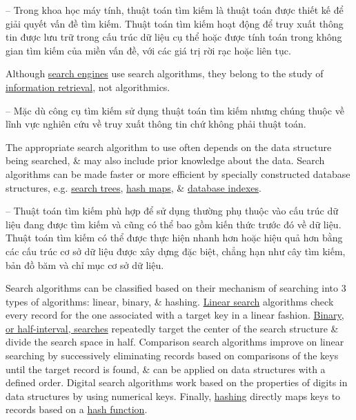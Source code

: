 \documentclass{article}
\begin{document}
-- Trong khoa học máy tính, thuật toán tìm kiếm là thuật toán được thiết kế để giải quyết vấn đề tìm kiếm. Thuật toán tìm kiếm hoạt động để truy xuất thông tin được lưu trữ trong cấu trúc dữ liệu cụ thể hoặc được tính toán trong không gian tìm kiếm của miền vấn đề, với các giá trị rời rạc hoặc liên tục.

Although \href{https://en.wikipedia.org/wiki/Search_engine_(computing)}{search engines} use search algorithms, they belong to the study of \href{https://en.wikipedia.org/wiki/Information_retrieval}{information retrieval}, not algorithmics.

-- Mặc dù công cụ tìm kiếm sử dụng thuật toán tìm kiếm nhưng chúng thuộc về lĩnh vực nghiên cứu về truy xuất thông tin chứ không phải thuật toán.

The appropriate search algorithm to use often depends on the data structure being searched, \& may also include prior knowledge about the data. Search algorithms can be made faster or more efficient by specially constructed database structures, e.g. \href{https://en.wikipedia.org/wiki/Search_tree}{search trees}, \href{https://en.wikipedia.org/wiki/Hash_map}{hash maps}, \& \href{https://en.wikipedia.org/wiki/Database_index}{database indexes}.

-- Thuật toán tìm kiếm phù hợp để sử dụng thường phụ thuộc vào cấu trúc dữ liệu đang được tìm kiếm và cũng có thể bao gồm kiến thức trước đó về dữ liệu. Thuật toán tìm kiếm có thể được thực hiện nhanh hơn hoặc hiệu quả hơn bằng các cấu trúc cơ sở dữ liệu được xây dựng đặc biệt, chẳng hạn như cây tìm kiếm, bản đồ băm và chỉ mục cơ sở dữ liệu.

Search algorithms can be classified based on their mechanism of searching into 3 types of algorithms: linear, binary, \& hashing. \href{https://en.wikipedia.org/wiki/Linear_search}{Linear search} algorithms check every record for the one associated with a target key in a linear fashion. \href{https://en.wikipedia.org/wiki/Binary_search_algorithm}{Binary, or half-interval, searches} repeatedly target the center of the search structure \& divide the search space in half. Comparison search algorithms improve on linear searching by successively eliminating records based on comparisons of the keys until the target record is found, \& can be applied on data structures with a defined order. Digital search algorithms work based on the properties of digits in data structures by using numerical keys. Finally, \href{https://en.wikipedia.org/wiki/Hash_table}{hashing} directly maps keys to records based on a \href{https://en.wikipedia.org/wiki/Hash_function}{hash function}.
\end{document}
